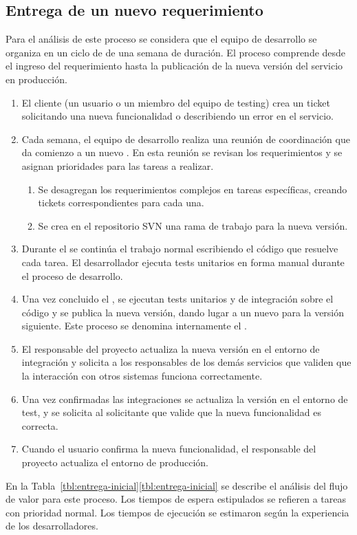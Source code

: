 \subsection{Entrega de un nuevo requerimiento}

Para el análisis de este proceso se considera que el equipo de
desarrollo se organiza en un ciclo de  de una semana
de duración. El proceso comprende desde el ingreso del requerimiento
hasta la publicación de la nueva versión del servicio en producción.

\begin{enumerate}
\item El cliente (un usuario o un miembro del equipo de testing) crea
  un ticket solicitando una nueva funcionalidad o describiendo un
  error en el servicio.
\item Cada semana, el equipo de desarrollo realiza una reunión de
  coordinación que da comienzo a un nuevo . En esta
  reunión se revisan los requerimientos y se asignan prioridades para
  las tareas a realizar.
\begin{enumerate}
\item Se desagregan los requerimientos complejos en tareas
  específicas, creando tickets correspondientes para cada una.
\item Se crea en el repositorio SVN una rama de trabajo para la nueva
  versión.
\end{enumerate}
\item Durante el  se continúa el trabajo normal
  escribiendo el código que resuelve cada tarea. El desarrollador
  ejecuta tests unitarios en forma manual durante el proceso de
  desarrollo.
\item Una vez concluido el , se ejecutan tests
  unitarios y de integración sobre el código y se publica la nueva
  versión, dando lugar a un nuevo  para la versión
  siguiente. Este proceso se denomina internamente el .
\item El responsable del proyecto actualiza la nueva versión en el
  entorno de integración y solicita a los responsables de los demás
  servicios que validen que la interacción con otros sistemas funciona
  correctamente.
\item Una vez confirmadas las integraciones se actualiza la versión en
  el entorno de test, y se solicita al solicitante que valide que la
  nueva funcionalidad es correcta.
\item Cuando el usuario confirma la nueva funcionalidad, el
  responsable del proyecto actualiza el entorno de producción.
\end{enumerate}
En la \iflatexml{}Tabla~\ref{tbl:entrega-inicial}\else\autoref{tbl:entrega-inicial}\fi
se describe el análisis del flujo de valor para este
proceso. Los tiempos de espera estipulados se refieren a tareas con
prioridad normal. Los tiempos de ejecución se estimaron según la
experiencia de los desarrolladores.




